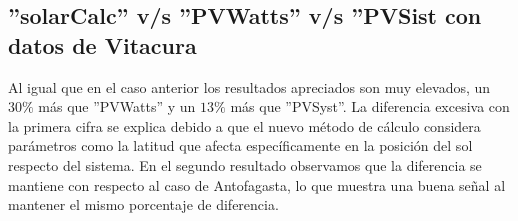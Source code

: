 \newpage
\subsection{''solarCalc'' v/s ''PVWatts'' v/s ''PVSist con datos de Vitacura}
\label{compvit}
\begin{table}[h!]
\caption{Comparación de software con datos de Vitacura}
\end{table}
Al igual que en el caso anterior los resultados apreciados son muy elevados, un $30\%$ más que ''PVWatts'' y un $13\%$ más que ''PVSyst''. La diferencia excesiva con la primera cifra se explica debido a que el nuevo método de cálculo considera parámetros como la latitud que afecta específicamente en la posición del sol respecto del sistema. En el segundo resultado observamos que la diferencia se mantiene con respecto al caso de Antofagasta, lo que muestra una buena señal al mantener el mismo porcentaje de diferencia.

\newpage
